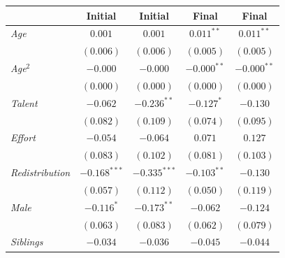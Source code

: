 
\begin{table}[htpb]
\begin{center}
\begin{footnotesize}
\begin{threeparttable}
\begin{tabular}{l c c c c}
\toprule
 & Initial & Initial & Final & Final \\
\midrule
\textit{Age}                                                        & $0.001$        & $0.001$        & $0.011^{**}$  & $0.011^{**}$  \\
                                                                    & $(0.006)$      & $(0.006)$      & $(0.005)$     & $(0.005)$     \\
\textit{Age}$^2$                                                    & $-0.000$       & $-0.000$       & $-0.000^{**}$ & $-0.000^{**}$ \\
                                                                    & $(0.000)$      & $(0.000)$      & $(0.000)$     & $(0.000)$     \\
\textit{Talent}                                                     & $-0.062$       & $-0.236^{**}$  & $-0.127^{*}$  & $-0.130$      \\
                                                                    & $(0.082)$      & $(0.109)$      & $(0.074)$     & $(0.095)$     \\
\textit{Effort}                                                     & $-0.054$       & $-0.064$       & $0.071$       & $0.127$       \\
                                                                    & $(0.083)$      & $(0.102)$      & $(0.081)$     & $(0.103)$     \\
\textit{Redistribution}                                             & $-0.168^{***}$ & $-0.335^{***}$ & $-0.103^{**}$ & $-0.130$      \\
                                                                    & $(0.057)$      & $(0.112)$      & $(0.050)$     & $(0.119)$     \\
\textit{Male}                                                       & $-0.116^{*}$   & $-0.173^{**}$  & $-0.062$      & $-0.124$      \\
                                                                    & $(0.063)$      & $(0.083)$      & $(0.062)$     & $(0.079)$     \\
\textit{Siblings}                                                   & $-0.034$       & $-0.036$       & $-0.045$      & $-0.044$      \\

\end{tabular}
\end{threeparttable}
\end{footnotesize}
\end{center}
\end{table}

